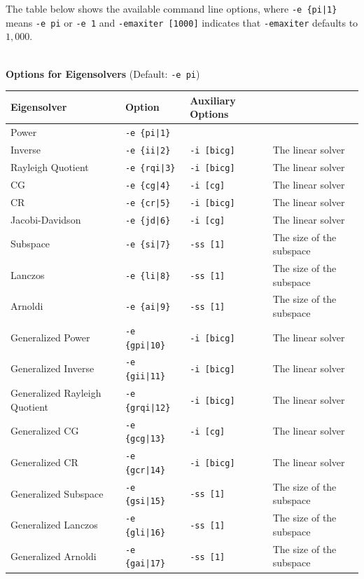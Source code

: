 \documentclass[a4paper]{article}
\begin{document}
The table below shows the available command line options, 
where \verb=-e {pi|1}= means \verb=-e pi= or \verb=-e 1= and \verb=-emaxiter [1000]= indicates 
that \verb=-emaxiter= defaults to $1,000$.
\\
\\
\begin{minipage}[t]{\textwidth}
\begin{center}
{\bf Options for Eigensolvers} (Default: \verb=-e pi=) \\
\begin{tabular}{l|lll}\hline\hline
 Eigensolver      & Option              &  Auxiliary Options  & \\ \hline
\hline
 Power                             & \verb=-e {pi|1}=        &    \\ 
 Inverse                           & \verb=-e {ii|2}=        & 
 \verb=-i [bicg]= & The linear solver \\
 Rayleigh Quotient                 & \verb=-e {rqi|3}=       &
 \verb=-i [bicg]= & The linear solver \\
 CG                                & \verb=-e {cg|4}=        &
 \verb=-i [cg]= & The linear solver \\ 
 CR                                & \verb=-e {cr|5}=        &
 \verb=-i [bicg]= & The linear solver \\ 
 Jacobi-Davidson                   & \verb=-e {jd|6}=        &
 \verb=-i [cg]= & The linear solver \\ 
 Subspace                          & \verb=-e {si|7}=        &
 \verb=-ss [1]= & The size of the subspace \\
 Lanczos                           & \verb=-e {li|8}=        &
 \verb=-ss [1]= & The size of the subspace \\
 Arnoldi                           & \verb=-e {ai|9}=        &
 \verb=-ss [1]= & The size of the subspace \\
 Generalized Power                 & \verb=-e {gpi|10}=      &
 \verb=-i [bicg]= & The linear solver \\ 
 Generalized Inverse               & \verb=-e {gii|11}=      & 
 \verb=-i [bicg]= & The linear solver \\
 Generalized Rayleigh Quotient     & \verb=-e {grqi|12}=      & 
 \verb=-i [bicg]= & The linear solver \\ 
 Generalized CG                    & \verb=-e {gcg|13}=      & 
 \verb=-i [cg]= & The linear solver \\
 Generalized CR                    & \verb=-e {gcr|14}=      & 
 \verb=-i [bicg]= & The linear solver \\
 Generalized Subspace              & \verb=-e {gsi|15}=      &
 \verb=-ss [1]= & The size of the subspace \\
 Generalized Lanczos               & \verb=-e {gli|16}=      &
 \verb=-ss [1]= & The size of the subspace \\
 Generalized Arnoldi               & \verb=-e {gai|17}=      &
 \verb=-ss [1]= & The size of the subspace \\  
\hline         
\end{tabular}
\end{center}
\end{minipage}
\end{document}
